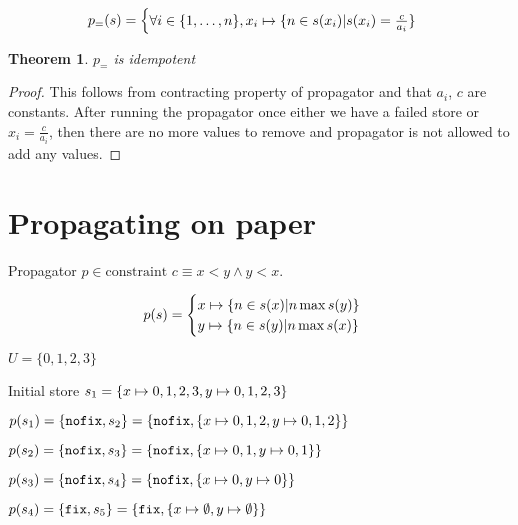 \documentclass[a4paper, 11pt]{article}
\newtheorem{theorem}{Theorem}[section]
\newcommand\mymapsto{\mathrel{\ooalign{$\rightarrow$\cr%
  \kern-.15ex\raise.275ex\hbox{\scalebox{1}[0.522]{$\mid$}}\cr}}}
\begin{document}
\begin{gather*}
p_=(s) = 
\begin{cases}
  \forall i \in \{1, \ldots, n\}, x_i \mymapsto \{n \in s(x_i) | s(x_i) = \frac{c}{a_i}\}\\
\end{cases}
\end{gather*}

\begin{theorem}
  $p_=$ is idempotent
\end{theorem}
\begin{proof}
This follows from contracting property of propagator and that $a_i$, $c$ are constants. After running the propagator once either we have a failed store or $x_i = \frac{c}{a_i}$, then there are no more values to remove and propagator is not allowed to add any values.
\end{proof}

\section*{Propagating on paper}
Propagator $p \in \text{constraint } c \equiv x < y \land y < x$.

\begin{gather*}
p(s) = 
\begin{cases}
  x \mymapsto \{n \in s(x) | n \max s(y) \}\\
  y \mymapsto \{n \in s(y) | n \max s(x) \}\\
\end{cases}
\end{gather*}

$U = \{0,1,2,3\}$

Initial store $s_1 = \{x \mymapsto {0,1,2,3}, y \mymapsto {0,1,2,3}\}$

$p(s_1) = \{\text{\texttt{nofix}}, s_2\} = \{\text{\texttt{nofix}}, \{x \mymapsto {0,1,2}, y \mymapsto {0,1,2}\}\}$

$p(s_2) = \{\text{\texttt{nofix}}, s_3\} = \{\text{\texttt{nofix}}, \{x \mymapsto {0,1}, y \mymapsto {0,1}\}\}$

$p(s_3) = \{\text{\texttt{nofix}}, s_4\} = \{\text{\texttt{nofix}}, \{x \mymapsto {0}, y \mymapsto {0}\}\}$

$p(s_4) = \{\text{\texttt{fix}}, s_5\} = \{\text{\texttt{fix}}, \{x \mymapsto \emptyset, y \mymapsto \emptyset\}\}$ 


{}

\end{document}
